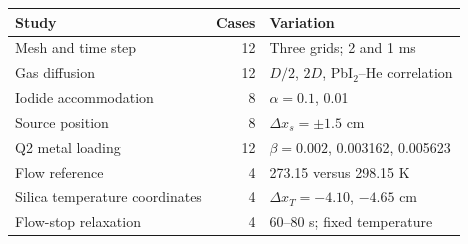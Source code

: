 \begin{tabular}{lrl}
\toprule
Study & Cases & Variation \\
\midrule
Mesh and time step & 12 & Three grids; 2 and 1 ms \\
Gas diffusion & 12 & $D/2$, $2D$, PbI$_2$--He correlation \\
Iodide accommodation & 8 & $\alpha=0.1$, 0.01 \\
Source position & 8 & $\Delta x_s=\pm1.5$ cm \\
Q2 metal loading & 12 & $\beta=0.002$, 0.003162, 0.005623 \\
Flow reference & 4 & 273.15 versus 298.15 K \\
Silica temperature coordinates & 4 & $\Delta x_T=-4.10$, $-4.65$ cm \\
Flow-stop relaxation & 4 & 60--80 s; fixed temperature \\
\bottomrule
\end{tabular}
